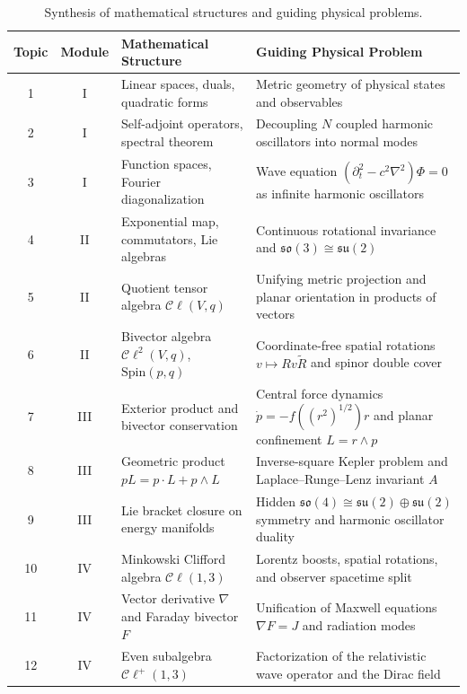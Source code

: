 \documentclass[11pt,a4paper]{article}
\newcommand{\Cl}{\mathcal{C}\ell}
\begin{document}
\begin{table}[htbp]
  \centering
  \caption{Synthesis of mathematical structures and guiding physical problems.}
  \label{tab:summary}
  \small
  \renewcommand{\arraystretch}{1.25}
  \begin{tabularx}{\textwidth}{%
    @{}%
    c%
    c%
    >{\raggedright\arraybackslash}p{4.8cm}%
    >{\raggedright\arraybackslash}X%
    @{}%
  }
    \toprule
    Topic & Module & Mathematical Structure & Guiding Physical Problem \\
    \midrule
    1  & I   & Linear spaces, duals, quadratic forms &
      Metric geometry of physical states and observables \\
    2  & I   & Self-adjoint operators, spectral theorem &
      Decoupling $N$ coupled harmonic oscillators into normal modes \\
    3  & I   & Function spaces, Fourier diagonalization &
      Wave equation $(\partial_{t}^{2} - c^{2}\nabla^{2})\Phi = 0$ as infinite
      harmonic oscillators \\
    \midrule
    4  & II  & Exponential map, commutators, Lie algebras &
      Continuous rotational invariance and $\mathfrak{so}(3) \cong
      \mathfrak{su}(2)$ \\
    5  & II  & Quotient tensor algebra $\Cl(V,q)$ &
      Unifying metric projection and planar orientation in products of
      vectors \\
    6  & II  & Bivector algebra $\Cl^{2}(V,q)$, $\mathrm{Spin}(p,q)$ &
      Coordinate-free spatial rotations $v \mapsto Rv\tilde{R}$ and spinor
      double cover \\
    \midrule
    7  & III & Exterior product and bivector conservation &
      Central force dynamics $\dot{p} = -f((r^{2})^{1/2})r$ and planar
      confinement $L = r \wedge p$ \\
    8  & III & Geometric product $pL = p \cdot L + p \wedge L$ &
      Inverse-square Kepler problem and Laplace--Runge--Lenz invariant $A$ \\
    9  & III & Lie bracket closure on energy manifolds &
      Hidden $\mathfrak{so}(4) \cong \mathfrak{su}(2) \oplus \mathfrak{su}(2)$
      symmetry and harmonic oscillator duality \\
    \midrule
    10 & IV  & Minkowski Clifford algebra $\Cl(1,3)$ &
      Lorentz boosts, spatial rotations, and observer spacetime split \\
    11 & IV  & Vector derivative $\nabla$ and Faraday bivector $F$ &
      Unification of Maxwell equations $\nabla F = J$ and radiation modes \\
    12 & IV  & Even subalgebra $\Cl^{+}(1,3)$ &
      Factorization of the relativistic wave operator and the Dirac field \\
    \bottomrule
  \end{tabularx}
\end{table}
\end{document}
